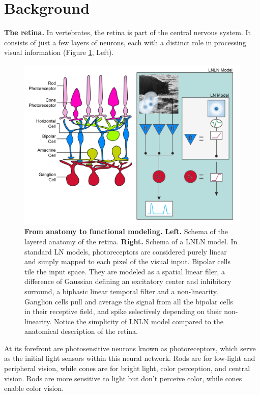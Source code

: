\section{Background}\label{sec:background}

\textbf{The retina.}
In vertebrates, the retina is part of the central nervous system. It consists
of just a few layers of neurons, each with a distinct role in processing visual
information (Figure \ref{fig:retina_structure}, Left).

\begin{figure}[h]
    \centering
    \includegraphics[width=\textwidth]{pics/RetinaAnatToFunction.png}
    \caption{\textbf{From anatomy to functional modeling.} \textbf{Left.}
        Schema of the layered anatomy of the retina. \textbf{Right.} Schema of
        a LNLN
        model. In standard LN
        models,
        photoreceptors are considered purely linear and simply mapped to each
        pixel of
        the visual input. Bipolar cells tile the input space. They are modeled
        as a
        spatial linear filer, a difference of Gaussian defining an excitatory
        center and
        inhibitory surround, a biphasic linear temporal filter and a
        non-linearity.
        Ganglion cells pull and average the signal from all the bipolar cells
        in
        their
        receptive field, and spike selectively depending on their
        non-linearity. Notice the simplicity of LNLN model compared to the
        anatomical
        description of the retina.}
    \label{fig:retina_structure}
\end{figure}

At its forefront are photosensitive neurons known as photoreceptors, which
serve as the initial light sensors within this neural network. Rods are for
low-light
and peripheral vision, while cones are for bright light, color perception, and
central vision. Rods are more sensitive to light but don't perceive color,
while cones enable color vision.

